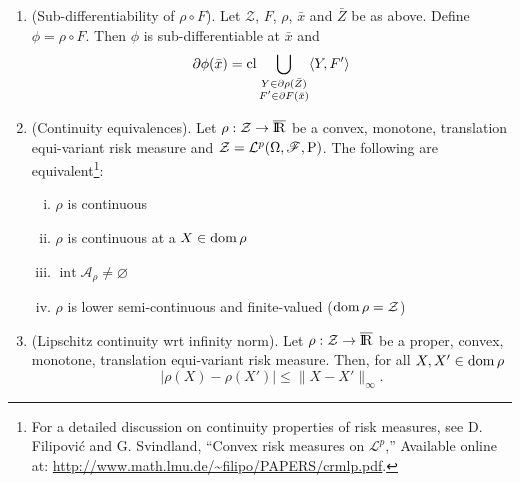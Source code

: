 \documentclass[a4paper,10pt]{scrbook}
\begin{document}
\begin{enumerate}
       $F:\Re^n\to\mathcal{Z}$ be a convex mapping and $\rho:\mathcal{Z}\to\barre$ be a convex monotone 
       risk measure which is finite-valued and continuous at $\bar{Z} = F(\bar{x})$.
       Then, $\phi\dfn \rho\circ F$ is directionally differentiable at $\bar{x}$,
       $\phi'(\bar{x};h)$ is finite-valued for all $h\in\Re^n$ and\footnote{%
       $F$ maps a vector $x$ to random variables, so it is $F(x)(\omega)=f(x,\omega)$. The directional derivative of $f$ with 
       respect to $x$ along a direction $h$ is $f'(\bar{x}; h)$ and it is a random variable. The scalar product here is defined as
       $\<Y, f'(\bar{x}; h)\> = \int_{\Omega} Y(\omega) f'(\bar{x}; h)(\omega) \d \prob(\omega)$.}
       \[
        \phi'(\bar{x}; h) = \sup_{Y \in \partial \rho(\bar{Z})}\<Y, f'(\bar{x}; h)\>
       \]
       
 \item (Sub-differentiability of $\rho\circ F$). Let $\mathcal{Z}$, $F$, $\rho$, $\bar{x}$ and $\bar{Z}$ be as above.
       Define $\phi = \rho\circ F$. 
       Then $\phi$ is sub-differentiable at $\bar{x}$ and 
       \[
        \partial \phi(\bar{x}) = \operatorname{cl} 
        \bigcup_{\substack{Y\in \partial \rho(\bar{Z})\\F'\in \partial F(\bar{x})}}\langle Y, F'\rangle
       \]
       
 \item (Continuity equivalences). Let $\rho:\mathcal{Z}\to\barre$ be a convex, monotone, translation
       equi-variant risk measure and $\mathcal{Z}=\mathcal{L}^p(\Omega,\mathscr{F},\mathrm{P})$. 
       The following are equivalent\footnote{%
       For a detailed discussion on continuity properties of risk measures, see D. Filipovi{\'c} 
       and G. Svindland, ``Convex risk measures on $\mathcal{L}^p$,''
       Available online at: \url{http://www.math.lmu.de/~filipo/PAPERS/crmlp.pdf}.}:
       \begin{enumerate}[i.]
        \item $\rho$ is continuous
        \item $\rho$ is continuous at a $X\in\operatorname{dom} \rho$
        \item $\operatorname{int} \mathcal{A}_\rho \neq \varnothing$
        \item $\rho$ is lower semi-continuous and finite-valued ($\operatorname{dom} \rho = \mathcal{Z}$)
       \end{enumerate}

 
 \item (Lipschitz continuity wrt infinity norm). Let $\rho:\mathcal{Z}\to\barre$ be a proper, 
       convex, monotone, translation equi-variant risk measure. Then, for all $X,X'\in\operatorname{dom}\rho$
       \[
        \left|\rho(X)-\rho(X')\right| \leq \|X-X'\|_{\infty}.
       \]



\end{enumerate}
\end{document}
